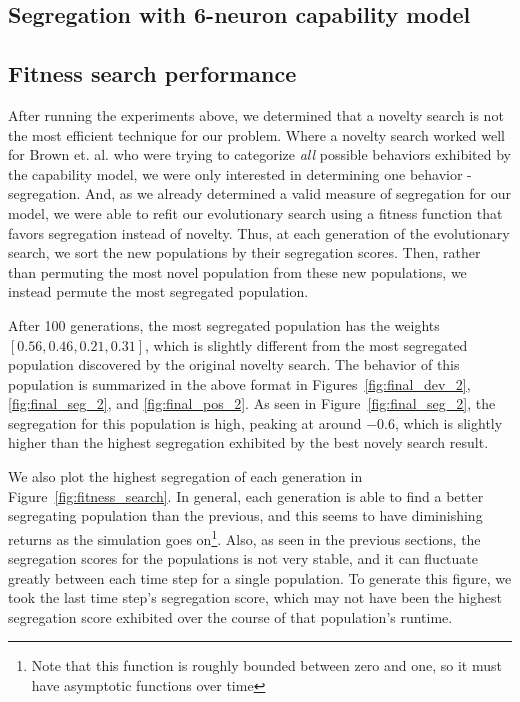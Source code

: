 \subsection{Segregation with 6-neuron capability model}
\label{sec:seg6}



\subsection{Fitness search performance}
\label{sec:fitness}

After running the experiments above, we determined that a novelty search is not the most efficient technique for our problem. 
Where a novelty search worked well for Brown et. al. who were trying to categorize \emph{all} possible behaviors exhibited by the capability model, we were only interested in determining one behavior - segregation.
And, as we already determined a valid measure of segregation for our model, we were able to refit our evolutionary search using a fitness function that favors segregation instead of novelty. 
Thus, at each generation of the evolutionary search, we sort the new populations by their segregation scores. 
Then, rather than permuting the most novel population from these new populations, we instead permute the most segregated population.

After 100 generations, the most segregated population has the weights $[0.56, 0.46, 0.21, 0.31]$, which is slightly different from the most segregated population discovered by the original novelty search. 
The behavior of this population is summarized in the above format in Figures~\ref{fig:final_dev_2}, \ref{fig:final_seg_2}, and \ref{fig:final_pos_2}. 
As seen in Figure~\ref{fig:final_seg_2}, the segregation for this population is high, peaking at around $-0.6$, which is slightly higher than the highest segregation exhibited by the best novely search result. 

We also plot the highest segregation of each generation in Figure~\ref{fig:fitness_search}. 
In general, each generation is able to find a better segregating population than the previous, and this seems to have diminishing returns as the simulation goes on\footnote{Note that this function is roughly bounded between zero and one, so it must have asymptotic functions over time}. 
Also, as seen in the previous sections, the segregation scores for the populations is not very stable, and it can fluctuate greatly between each time step for a single population. 
To generate this figure, we took the last time step's segregation score, which may not have been the highest segregation score exhibited over the course of that population's runtime. 


